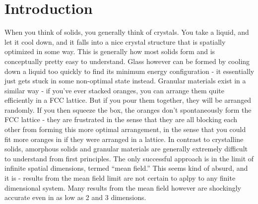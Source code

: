 \chapter{Introduction}

When you think of solids, you generally think of crystals. You take a liquid, and let it cool down, and it falls into a nice crystal structure that is spatially optimized in some way. This is generally how most solids form and is conceptually pretty easy to understand. Glass however can be formed by cooling down a liquid too quickly to find its minimum energy configuration - it essentially just gets stuck in some non-optimal state instead. Granular materials exist in a similar way - if you've ever stacked oranges, you can arrange them quite efficiently in a FCC lattice. But if you pour them together, they will be arranged randomly. If you then squeeze the box, the oranges don't spontaneously form the FCC lattice - they are frustrated in the sense that they are all blocking each other from forming this more optimal arrangement, in the sense that you could fit more oranges in if they were arranged in a lattice. In contrast to crystalline solids, amorphous solids and granular materials are generally extremely difficult to understand from first principles. The only successful approach is in the limit of infinite spatial dimensions, termed ``mean field.'' This seems kind of absurd, and it is - results from the mean field limit are not certain to aplpy to any finite dimensional system. Many results from the mean field however are shockingly accurate even in as low as 2 and 3 dimensions.

